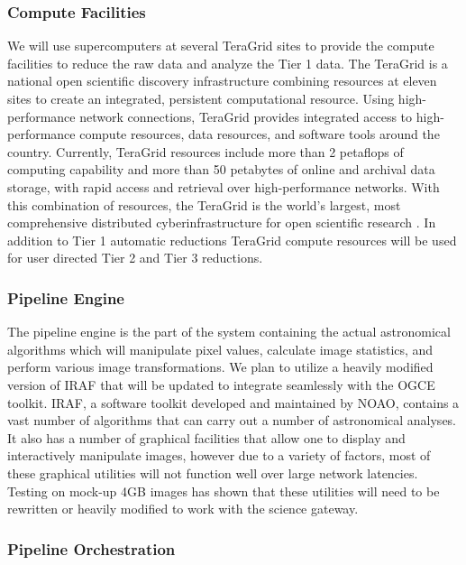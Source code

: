 \documentclass[10pt,conference]{IEEEtran}
\begin{document}
\subsubsection{Compute Facilities}

We will use supercomputers at several TeraGrid sites to provide the compute facilities to reduce the raw data and analyze the Tier 1 data. The TeraGrid is a national open scientific discovery infrastructure combining resources at eleven sites to create an integrated, persistent computational resource. Using high-performance network connections, TeraGrid provides integrated access to high-performance compute resources, data resources, and software tools around the country. Currently, TeraGrid resources include more than 2 petaflops of computing capability and more than 50 petabytes of online and archival data storage, with rapid access and retrieval over high-performance networks. With this combination of resources, the TeraGrid is the world's largest, most comprehensive distributed cyberinfrastructure for open scientific research \cite{teragrid}. In addition to Tier 1 automatic reductions TeraGrid compute resources will be used for user directed Tier 2 and Tier 3 reductions.

\subsubsection{Pipeline Engine}

The pipeline engine is the part of the system containing the actual astronomical algorithms which will manipulate pixel values, calculate image statistics, and perform various image transformations. We plan to utilize a heavily modified version of IRAF that will be updated to integrate seamlessly with the OGCE toolkit. IRAF, a software toolkit developed and maintained by NOAO, contains a vast number of algorithms that can carry out a number of astronomical analyses. It also has a number of graphical facilities that allow one to display and interactively manipulate images, however due to a variety of factors, most of these graphical utilities will not function well over large network latencies. Testing on mock-up 4GB images has shown that these utilities will need to be rewritten or heavily modified to work with the science gateway. 

\subsubsection{Pipeline Orchestration}
\end{document}

